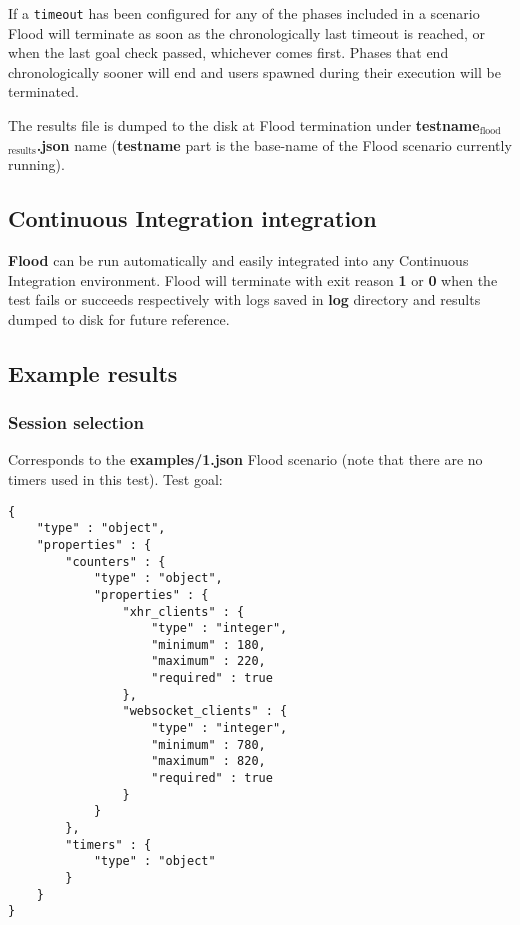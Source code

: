\documentclass[a4paper]{article}
\begin{document}
\noindent
If a \texttt{timeout} has been configured for any of the phases included in a scenario Flood will terminate as soon as the chronologically last timeout is reached, or when the last goal check passed, whichever comes first. Phases that end chronologically sooner will end and users spawned during their execution will be terminated.

\noindent
The results file is dumped to the disk at Flood termination under \textbf{testname$_{\mathrm{flood}}$$_{\mathrm{results}}$.json} name (\textbf{testname} part is the base-name of the Flood scenario currently running).
\subsection{Continuous Integration integration}
\label{sec-4-3}

\textbf{Flood} can be run automatically and easily integrated into any Continuous Integration environment. Flood will terminate with exit reason \textbf{1} or \textbf{0} when the test fails or succeeds respectively with logs saved in \textbf{log} directory and results dumped to disk for future reference.
\subsection{Example results}
\label{sec-4-4}
\label{ref-example_results}
\subsubsection{Session selection}
\label{sec-4-4-1}

Corresponds to the \textbf{examples/1.json} Flood scenario (note that there are no timers used in this test). Test goal:


\begin{verbatim}
{
    "type" : "object",
    "properties" : {
        "counters" : {
            "type" : "object",
            "properties" : {
                "xhr_clients" : {
                    "type" : "integer",
                    "minimum" : 180,
                    "maximum" : 220,
                    "required" : true
                },
                "websocket_clients" : {
                    "type" : "integer",
                    "minimum" : 780,
                    "maximum" : 820,
                    "required" : true
                }
            }
        },
        "timers" : {
            "type" : "object"
        }
    }
}
\end{verbatim}
\end{document}

